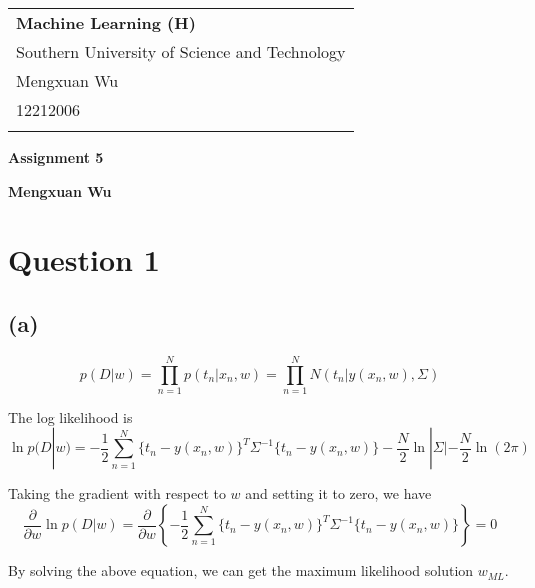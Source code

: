 \documentclass[a4paper,12pt]{article}
\newcommand{\pard}[2]{\frac{\partial #1}{\partial #2}}
\begin{document}
\thispagestyle{empty} %

\begin{tabular}{p{15.5cm}}
{\large \bf Machine Learning (H)} \\
Southern University of Science and Technology \\ Mengxuan Wu \\ 12212006 \\
\hline
\\
\end{tabular}

\vspace*{0.3cm} %

\begin{center}
	{\Large \bf Assignment 5}
	\vspace{2mm}

	{\bf Mengxuan Wu}
		
\end{center}  

\vspace{0.4cm}

\section*{Question 1}

\subsection*{(a)}

\begin{equation*}
	p(D|w) = \prod_{n=1}^{N} p(t_n|x_n,w) = \prod_{n=1}^{N} N(t_n|y(x_n,w),\Sigma)
\end{equation*}

The log likelihood is
\begin{equation*}
	\ln p(D|w) = -\frac{1}{2} \sum_{n=1}^{N} \{t_n - y(x_n,w)\}^T \Sigma^{-1} \{t_n - y(x_n,w)\} - \frac{N}{2} \ln |\Sigma| - \frac{N}{2} \ln (2\pi)
\end{equation*}

Taking the gradient with respect to $w$ and setting it to zero, we have
\begin{equation*}
	\pard{}{w} \ln p(D|w) = \pard{}{w} \left\{-\frac{1}{2} \sum_{n=1}^{N} \{t_n - y(x_n,w)\}^T \Sigma^{-1} \{t_n - y(x_n,w)\}\right\} = 0
\end{equation*}

By solving the above equation, we can get the maximum likelihood solution $w_{ML}$.
\end{document}
